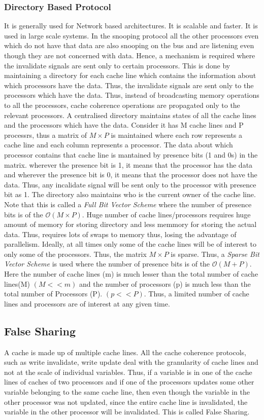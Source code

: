 \documentclass[12pt]{article}
\begin{document}
\subsubsection{Directory Based Protocol}
It is generally used for Network based architectures. It is scalable and faster. It is used in large scale systems.
In the snooping protocol all the other processors even which do not have that data are also snooping on the bus and are listening even though they are not concerned with data.
Hence, a mechanism is required where the invalidate signals are sent only to certain processors. This is done by maintaining a directory for each cache line 
which contains the information about which processors have the data. Thus, the invalidate signals are sent only to the processors which have the data.
Thus, instead of broadcasting memory operations to all the processors, cache coherence operations are propagated only to the relevant processors. 
A centralised directory maintains states of all the cache lines and the processors which have the data.
Consider it has M cache lines and P processrs, thus a matrix of $M \times P$ is maintained where each row represents a cache line and each column represents a processor.
The data about which processor contains that cache line is mantained by presence bits (1 and 0s) in the matrix. wherever the presence bit is 1,
it means that the processor has the data and wherever the presence bit is 0, it means that the processor does not have the data.
Thus, any incalidate signal will be sent only to the processor with presence bit as 1. The directory also maintains 
who is the current owner of the cache line. 
Note that this is called a \textit{Full Bit Vector Scheme} where the number of presence bits is of the $\mathcal{O}(M \times P)$.
Huge number of cache lines/processors requires huge amount of memory for storing directory and less memmory for storing the actual data. Thus, requires
lots of swaps to memory thus, losing the advantage of parallelism. Ideally, at all times only some of the cache lines will be of interest to only some of the processors. 
Thus, the matrix $M \times P$ is sparse. Thus, a \textit{Sparse Bit Vector Scheme} is used where the number of presence bits is of the $\mathcal{O}(M + P)$.
Here the number of cache lines (m) is much lesser than the total number of cache lines(M) $(M<<m)$ and the number of processors (p) is much less than the
total number of Processors (P). $(p<<P)$. Thus, a limited number of cache lines and processors are of interest at any given time.

\subsection{False Sharing}
A cache is made up of multiple cache lines. All the cache coherence protocols, such as write invalidate, write update deal with the granularity of cache lines and not at the scale of individual variables.
Thus, if a variable is in one of the cache lines of caches of two processors and if one of the processors updates some other variable belonging to the same cache line, then even though 
the variable in the other processor was not updated, since the entire cache line is invalidated, the variable in the other processor will be invalidated. This is called False Sharing.
\end{document}
